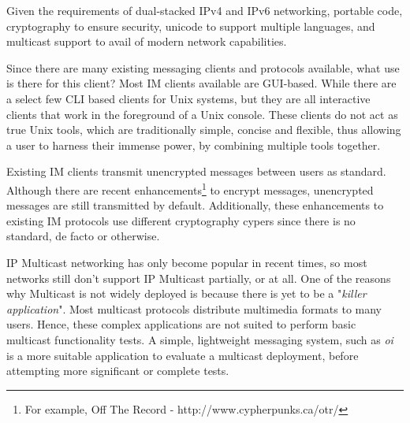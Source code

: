 
Given the requirements of dual-stacked IPv4 and IPv6 networking,
portable code, cryptography to ensure security, unicode to support
multiple languages, and multicast support to avail of modern network
capabilities.


Since there are many existing messaging clients and protocols available,
what use is there for this client? Most IM clients available are 
GUI-based. While there are a select few CLI based clients for Unix 
systems, but they are all interactive clients that work in the 
foreground of a Unix console. These clients do not act as true Unix 
tools, which are traditionally simple, concise and flexible, thus 
allowing a user to harness their immense power, by combining multiple 
tools together.


Existing IM clients transmit unencrypted messages between users as
standard. Although there are 
recent enhancements\footnote{For example, Off The Record - http://www.cypherpunks.ca/otr/}
to encrypt messages, unencrypted messages are still transmitted by 
default. Additionally, these enhancements to existing IM protocols use 
different cryptography cypers since there is no standard, de facto or 
otherwise.


IP Multicast networking has only become popular in recent times, so most
networks still don't support IP Multicast partially, or at all. One of
the reasons why Multicast is not widely deployed is because there is yet
to be a "\emph{killer application}". Most multicast protocols 
distribute multimedia formats to many users. Hence, these complex 
applications are not suited to perform basic multicast functionality 
tests. A simple, lightweight messaging system, such as \emph{oi} is a 
more suitable application to evaluate a multicast deployment, before 
attempting more significant or complete tests.
